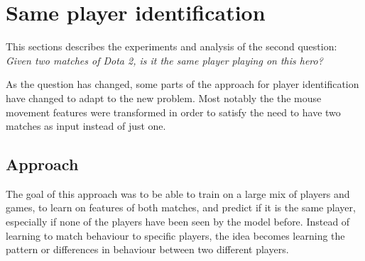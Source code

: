 \documentclass[Report.tex]{subfiles}
\begin{document}
\section{Same player identification}\label{sec:pair-classification}
This sections describes the experiments and analysis of the second question: \textit{Given two matches of Dota 2, is it the same player playing on this hero?}

As the question has changed, some parts of the approach for player identification have changed to adapt to the new problem. Most notably the the mouse movement features were transformed in order to satisfy the need to have two matches as input instead of just one. 

\subsection{Approach}

The goal of this approach was to be able to train on a large mix of players and games, to learn on features of both matches, and predict if it is the same player, especially if none of the players have been seen by the model before. Instead of learning to match behaviour to specific players, the idea becomes learning the pattern or differences in behaviour between two different players. 
\end{document}
